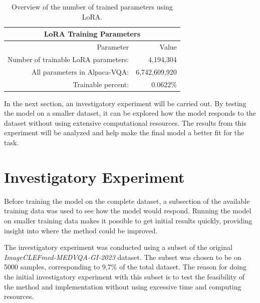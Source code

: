     \begin{table}[htb]
    \centering
    \begin{tabular}{ r r } 
        \multicolumn{2}{c}{\textbf{LoRA Training Parameters}}\\
        \toprule
           Parameter & Value \\
        \midrule
            Number of trainable LoRA parameters: & 4,194,304\\
            All parameters in Alpaca-VQA: & 6,742,609,920\\
            Trainable percent: & 0.0622\%\\[0.5ex]
        \bottomrule
    \end{tabular}
    \caption{Overview of the number of trained parameters using LoRA.}
    \label{table:lora_parms}
    \end{table}

    In the next section, an investigatory experiment will be carried out. By testing the model on a smaller dataset, it can be explored how the model responds to the dataset without using extensive computational resources. The results from this experiment will be analyzed and help make the final model a better fit for the task. 


\section{Investigatory Experiment}

Before training the model on the complete dataset, a subsection of the available training data was used to see how the model would respond. Running the model on smaller training data makes it possible to get initial results quickly, providing insight into where the method could be improved. 


    The investigatory experiment was conducted using a subset of the original \textit{ImageCLEFmed-MEDVQA-GI-2023} dataset. The subset was chosen to be on 5000 samples, corresponding to 9,7\% of the total dataset. The reason for doing the initial investigatory experiment with this subset is to test the feasibility of the method and implementation without using excessive time and computing resources. 
    
    

